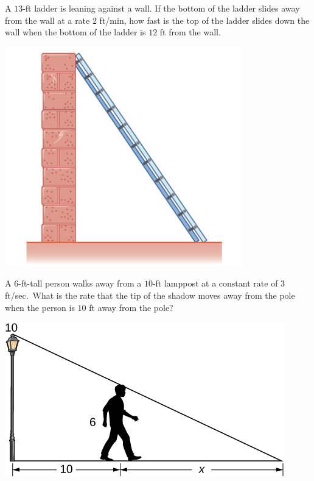 \begin{example}

A \(13\)-ft ladder is leaning against a wall. If the bottom of the
ladder slides away from the wall at a rate \(2\) ft/min, how fast is the
top of the ladder slides down the wall when the bottom of the ladder is
\(12\) ft from the wall.

\includegraphics[scale=0.5]{img/image-20201007131231366.png}

\end{example}
\vspace*{6\baselineskip}

\begin{example}

A \(6\)-ft-tall person walks away from a \(10\)-ft lamppost at a
constant rate of \(3\) ft/sec.~What is the rate that the tip of the
shadow moves away from the pole when the person is \(10\) ft away from
the pole?

\includegraphics[scale=0.8]{img/CNX_Calc_Figure_04_01_203.jpeg}

\end{example}
\vspace*{6\baselineskip}


